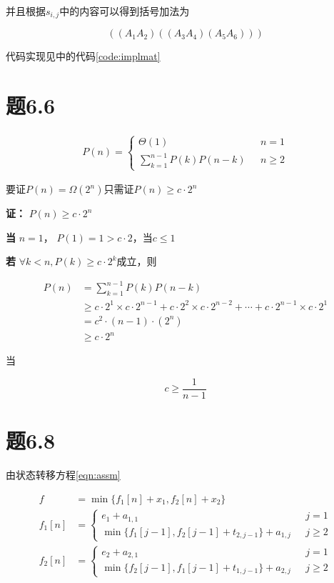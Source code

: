 \documentclass[a4paper,twoside]{article}
\begin{document}
\begin{spacing}{1.2}
并且根据$s_{i,j}$中的内容可以得到括号加法为

$$
( ( A_{1} A_{2} ) ( ( A_{3} A_{4} ) ( A_{5} A_{6} ) ) ) 
$$

代码实现见中的代码\ref{code:implmat}

\section{题6.6}

\begin{equation}
	\begin{aligned}
		P(n)=
		\begin{cases}
		\Theta(1) \ \ \ &n=1\\
		\mathop{\sum}_{k=1}^{n-1}P(k)P(n-k) \ \ \ &n\ge 2
		\end{cases}
	\end{aligned}
\end{equation}

要证$P(n)=\Omega (2^n)$只需证$P(n)\ge c\cdot 2^n$

\textbf{证：} $P(n)\ge c\cdot 2^n$

\textbf{当} $n=1$， $P(1)=1>c\cdot 2$，当$c\le 1$

\textbf{若} $\forall k<n, P(k) \ge c\cdot 2^k$成立，则

\begin{align*}
	P(n)&=\mathop{\sum}_{k=1}^{n-1}P(k)P(n-k)\\
	&\ge c\cdot 2^1 \times c\cdot 2^{n-1} + c\cdot 2^2 \times c\cdot 2^{n-2}+\cdots+  c\cdot 2^{n-1} \times  c\cdot2^1  \\
	&= c^2 \cdot (n-1) \cdot (2^n) \\
	&\ge c\cdot 2^n
\end{align*}

当

$$
c \ge \frac{1}{n-1}
$$

\section{题6.8}

由状态转移方程\eqref{eqn:assm}

\begin{equation}
\label{eqn:assm}
\begin{aligned}
f&=\min\{f_1[n]+x_1,f_2[n]+x_2\} \\
f_1[n]&=
\begin{cases}
	e_1+a_{1,1} \ \ \ &j=1 \\
	\min\{f_1[j-1],f_2[j-1]+t_{2,j-1}\}+a_{1,j} \ \ \ &j\ge2 
\end{cases} \\
f_2[n]&=
\begin{cases}
	e_2+a_{2,1} \ \ \ &j=1 \\
	\min\{f_2[j-1],f_1[j-1]+t_{1,j-1}\}+a_{2,j} \ \ \ &j\ge2 
\end{cases}
\end{aligned}
\end{equation}


\end{spacing}
\end{document}
